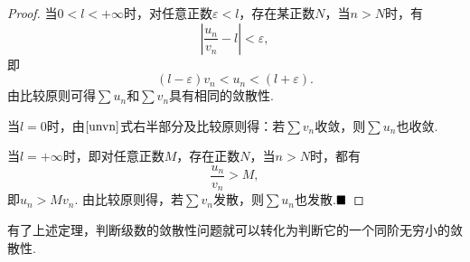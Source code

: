 \begin{proof}
	当$0<l<+\infty$时，对任意正数$\varepsilon<l$，存在某正数$N$，当$n>N$时，有
	$$\left|\frac{u_n}{v_n}-l\right|<\varepsilon,$$
	即
	\begin{equation}\label{unvn}
		(l-\varepsilon)v_n<u_n<(l+\varepsilon).
	\end{equation}
	由比较原则可得$\sum u_n$和$\sum v_n$具有相同的敛散性.
	
	当$l=0$时，由$\ref{unvn}$式右半部分及比较原则得：若$\sum v_n$收敛，则$\sum u_n$也收敛.
	
	当$l=+\infty$时，即对任意正数$M$，存在正数$N$，当$n>N$时，都有
	$$\frac{u_n}{v_n}>M,$$
	即$u_n>Mv_n$. 由比较原则得，若$\sum v_n$发散，则$\sum u_n$也发散.$\hfill\blacksquare$
\end{proof}
有了上述定理，判断级数的敛散性问题就可以转化为判断它的一个同阶无穷小的敛散性.
